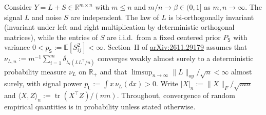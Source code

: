 \documentclass[11pt]{article}
\theoremstyle{plain}
\theoremstyle{definition}
\theoremstyle{remark}
\DeclareMathOperator{\tr}{tr}
\newcommand{\E}{\mathbb{E}}
\newcommand{\R}{\mathbb{R}}
\newcommand{\sL}{\mathsf{L}}
\newcommand{\sS}{\mathsf{S}}
\begin{document}
Consider $Y = L + S \in \R^{m \times n}$ with $m \le n$ and $m/n \to \beta \in (0, 1]$ as $m, n \to \infty$.
The signal $L$ and noise $S$ are independent. The law of $L$ is bi-orthogonally invariant (invariant under left and right multiplication by deterministic orthogonal matrices), while the entries of $S$ are i.i.d.\ from a fixed centered prior $P_{\sS}$ with variance $0 < p_{\sS} := \E[S_{ij}^2] < \infty$.
Section~II of \href{https://arxiv.org/abs/2611.29179}{arXiv:2611.29179} assumes that $\nu_{L,n} := m^{-1}\sum_{i=1}^m \delta_{\lambda_i(LL^\top/n)}$ converges weakly almost surely to a deterministic probability measure $\nu_L$ on $\R_+$ and that $\limsup_{n\to\infty}\|L\|_{\mathrm{op}}/\sqrt{n} < \infty$ almost surely, with signal power $p_{\sL} := \int x\,\nu_L(dx) > 0$.
Write $|X|_n := \|X\|_F / \sqrt{mn}$ and $\langle X, Z\rangle_n := \tr(X^\top Z)/(mn)$. Throughout, convergence of random empirical quantities is in probability unless stated otherwise.
\end{document}

